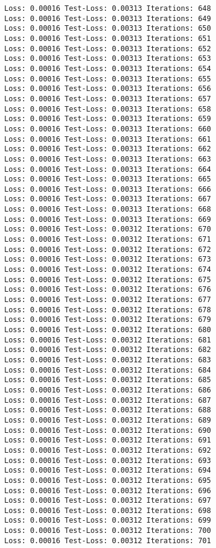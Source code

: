 \documentclass[11pt]{article}
\begin{document}
\begin{Verbatim}[commandchars=\\\{\}]
Loss: 0.00016 Test-Loss: 0.00313 Iterations: 648
Loss: 0.00016 Test-Loss: 0.00313 Iterations: 649
Loss: 0.00016 Test-Loss: 0.00313 Iterations: 650
Loss: 0.00016 Test-Loss: 0.00313 Iterations: 651
Loss: 0.00016 Test-Loss: 0.00313 Iterations: 652
Loss: 0.00016 Test-Loss: 0.00313 Iterations: 653
Loss: 0.00016 Test-Loss: 0.00313 Iterations: 654
Loss: 0.00016 Test-Loss: 0.00313 Iterations: 655
Loss: 0.00016 Test-Loss: 0.00313 Iterations: 656
Loss: 0.00016 Test-Loss: 0.00313 Iterations: 657
Loss: 0.00016 Test-Loss: 0.00313 Iterations: 658
Loss: 0.00016 Test-Loss: 0.00313 Iterations: 659
Loss: 0.00016 Test-Loss: 0.00313 Iterations: 660
Loss: 0.00016 Test-Loss: 0.00313 Iterations: 661
Loss: 0.00016 Test-Loss: 0.00313 Iterations: 662
Loss: 0.00016 Test-Loss: 0.00313 Iterations: 663
Loss: 0.00016 Test-Loss: 0.00313 Iterations: 664
Loss: 0.00016 Test-Loss: 0.00313 Iterations: 665
Loss: 0.00016 Test-Loss: 0.00313 Iterations: 666
Loss: 0.00016 Test-Loss: 0.00313 Iterations: 667
Loss: 0.00016 Test-Loss: 0.00313 Iterations: 668
Loss: 0.00016 Test-Loss: 0.00313 Iterations: 669
Loss: 0.00016 Test-Loss: 0.00312 Iterations: 670
Loss: 0.00016 Test-Loss: 0.00312 Iterations: 671
Loss: 0.00016 Test-Loss: 0.00312 Iterations: 672
Loss: 0.00016 Test-Loss: 0.00312 Iterations: 673
Loss: 0.00016 Test-Loss: 0.00312 Iterations: 674
Loss: 0.00016 Test-Loss: 0.00312 Iterations: 675
Loss: 0.00016 Test-Loss: 0.00312 Iterations: 676
Loss: 0.00016 Test-Loss: 0.00312 Iterations: 677
Loss: 0.00016 Test-Loss: 0.00312 Iterations: 678
Loss: 0.00016 Test-Loss: 0.00312 Iterations: 679
Loss: 0.00016 Test-Loss: 0.00312 Iterations: 680
Loss: 0.00016 Test-Loss: 0.00312 Iterations: 681
Loss: 0.00016 Test-Loss: 0.00312 Iterations: 682
Loss: 0.00016 Test-Loss: 0.00312 Iterations: 683
Loss: 0.00016 Test-Loss: 0.00312 Iterations: 684
Loss: 0.00016 Test-Loss: 0.00312 Iterations: 685
Loss: 0.00016 Test-Loss: 0.00312 Iterations: 686
Loss: 0.00016 Test-Loss: 0.00312 Iterations: 687
Loss: 0.00016 Test-Loss: 0.00312 Iterations: 688
Loss: 0.00016 Test-Loss: 0.00312 Iterations: 689
Loss: 0.00016 Test-Loss: 0.00312 Iterations: 690
Loss: 0.00016 Test-Loss: 0.00312 Iterations: 691
Loss: 0.00016 Test-Loss: 0.00312 Iterations: 692
Loss: 0.00016 Test-Loss: 0.00312 Iterations: 693
Loss: 0.00016 Test-Loss: 0.00312 Iterations: 694
Loss: 0.00016 Test-Loss: 0.00312 Iterations: 695
Loss: 0.00016 Test-Loss: 0.00312 Iterations: 696
Loss: 0.00016 Test-Loss: 0.00312 Iterations: 697
Loss: 0.00016 Test-Loss: 0.00312 Iterations: 698
Loss: 0.00016 Test-Loss: 0.00312 Iterations: 699
Loss: 0.00016 Test-Loss: 0.00312 Iterations: 700
Loss: 0.00016 Test-Loss: 0.00312 Iterations: 701

\end{Verbatim}
\end{document}
